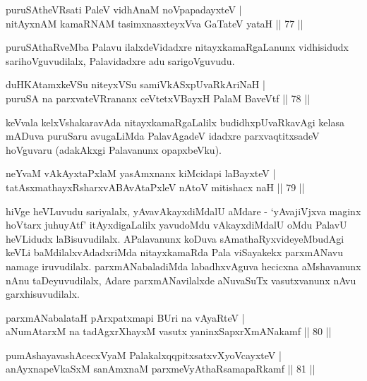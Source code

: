 \begin{shl}
puruSAtheVR\s sati PaleV vidhAnaM noVpapadayxteV |\\
nitAyxnAM kamaRNAM tasimxnasxteyxVva GaTateV yataH \hfill || 77 ||
\end{shl}

\begin{artha}
puruSAthaRveMba Palavu ilalxdeVidadxre nitayxkamaRgaLanunx vidhisidudx sarihoVguvudilalx, Palavidadxre adu sarigoVguvudu.
\end{artha}


\begin{shl}
duHKAtamxkeVSu niteyxVSu samiVkASxpUvaRkAriNaH |\\
puruSA na parxvateVRrananx ceVtetxVBayxH PalaM BaveVtf \hfill || 78 ||
\end{shl}

\begin{artha}
keVvala kelxVshakaravAda  nitayxkamaRgaLalilx budidhxpUvaRkavAgi kelasa mADuva puruSaru avugaLiMda PalavAgadeV idadxre parxvaqtitxsadeV hoVguvaru (adakAkxgi Palavanunx opapxbeVku).
\end{artha}


\begin{shl}
neYvaM vAkAyxtaPxlaM yasAmxnanx kiMcidapi laBayxteV |\\
tatAsxmathayxRsharxvABAvAtaPxleV nAtoV mitishacx naH \hfill || 79 ||
\end{shl}

\begin{artha}
hiVge heVLuvudu sariyalalx, yAvavAkayxdiMdalU aMdare - `yAvajiVjxva maginx hoVtarx juhuyAtf' itAyxdigaLalilx yavudoMdu vAkayxdiMdalU oMdu PalavU heVLidudx laBisuvudilalx. APalavanunx koDuva sAmathaRyxvideyeMbudAgi keVLi baMdilalxvAdadxriMda nitayxkamaRda Pala viSayakekx parxmANavu namage iruvudilalx. parxmANabaladiMda labadhxvAguva hecicxna aMshavanunx nAnu taDeyuvudilalx, Adare parxmANavilalxde aNuvaSuTx vasutxvanunx nAvu garxhisuvudilalx.
\end{artha}

\begin{shl}
parxmANabalataH pArxpatxmapi BUri na vAyaRteV |\\
aNumAtarxM na tadAgxrXhayxM vasutx yaninxSapxrXmANakamf \hfill || 80 ||
\end{shl}

\begin{shl}
pumAshayavashAcecxVyaM PalakalxqqpitxsatxvXyoVcayxteV |\\
anAyxnapeVkaSxM sanAmxnaM parxmeVyAthaRsamapaRkamf \hfill || 81 ||
\end{shl}

